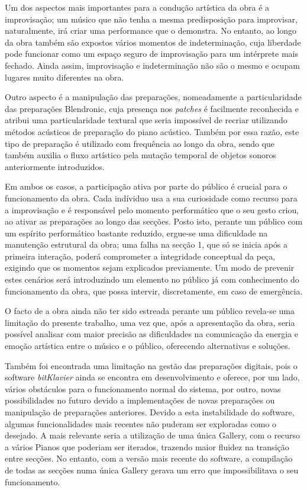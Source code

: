 \documentclass[../main.tex]{subfiles}
\begin{document}
Um dos aspectos mais importantes para a condução artística da obra é a improvisação; um músico que não tenha a mesma predisposição para improvisar, naturalmente, irá criar uma performance que o demonstra. No entanto, ao longo da obra também são expostos vários momentos de indeterminação, cuja liberdade pode funcionar como um espaço seguro de improvisação para um intérprete mais fechado. Ainda assim, improvisação e indeterminação não são o mesmo e ocupam lugares muito diferentes na obra.

Outro aspecto é a manipulação das preparações, nomeadamente a particularidade das preparações Blendronic, cuja presença nos \textsl{patches} é facilmente reconhecida e atribui uma particularidade textural que seria impossível de recriar utilizando métodos acústicos de preparação do piano acústico. Também por essa razão, este tipo de preparação é utilizado com frequência ao longo da obra, sendo que também auxilia o fluxo artístico pela mutação temporal de objetos sonoros anteriormente introduzidos.

Em ambos os casos, a participação ativa por parte do público é crucial para o funcionamento da obra. Cada indíviduo usa a sua curiosidade como recurso para a improvisação e é responsável pelo momento performático que o seu gesto criou, ao ativar as preparações ao longo das secções. Posto isto, perante um público com um espírito performático bastante reduzido, ergue-se uma dificuldade na manutenção estrutural da obra; uma falha na secção 1, que só se inicia após a primeira interação, poderá comprometer a integridade conceptual da peça, exigindo que os momentos sejam explicados previamente. Um modo de prevenir estes cenários será introduzindo um elemento no público já com conhecimento do funcionamento da obra, que possa intervir, discretamente, em caso de emergência.

O facto de a obra ainda não ter sido estreada perante um público revela-se uma limitação do presente trabalho, uma vez que, após a apresentação da obra, seria possível analisar com maior precisão as dificuldades na comunicação da energia e emoção artística entre o músico e o público, oferecendo alternativas e soluções. 

Também foi encontrada uma limitação na gestão das preparações digitais, pois o software \textsl{bitKlavier} ainda se encontra em desenvolvimento e oferece, por um lado, vários obstáculos para o funcionamento normal do sistema, por outro, novas possibilidades no futuro devido a implementações de novas preparações ou manipulação de preparações anteriores. Devido a esta instabilidade do software, algumas funcionalidades mais recentes não puderam ser exploradas como o desejado. A mais relevante seria a utilização de uma única Gallery, com o recurso a vários Pianos que poderiam ser iterados, trazendo maior fluidez na transição entre secções. No entanto, com a versão mais recente do software, a compilação de todas as secções numa única Gallery gerava um erro que impossibilitava o seu funcionamento.
\end{document}
